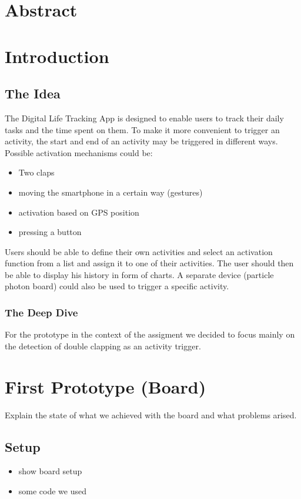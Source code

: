 \documentclass
[
 12pt, %
       DIV12,
       a4paper,
       oneside,
       titlepage,
       parskip=half,
       headings=normal,
       listof=totoc,
       bibliography=totoc,
       index=totoc,
       captions=tableheading,
       ]{scrreprt}
\author{Dennis Müller}
\date{\today}
\title{}
\begin{document}
\tableofcontents


\chapter{Abstract}
\label{sec:orgf5e4737}
\chapter{Introduction}
\label{sec:orgef98480}
\section{The Idea}
\label{sec:org9600a05}

The Digital Life Tracking App is designed to enable users to track their daily tasks and the time spent on them.
To make it more convenient to trigger an activity, the start and end of an activity may be triggered in different ways. 
Possible activation mechanisms could be:
\begin{itemize}
\item Two claps
\item moving the smartphone in a certain way (gestures)
\item activation based on GPS position
\item pressing a button
\end{itemize}

Users should be able to define their own activities and select an activation function from a list and assign it to one of their activities.
The user should then be able to display his history in form of charts.
A separate device (particle photon board) could also be used to trigger a specific activity.

\subsection{The Deep Dive}
\label{sec:org7e5fafa}
For the prototype in the context of the assigment we decided to focus mainly on the detection of double clapping as an activity trigger.



\chapter{First Prototype (Board)}
\label{sec:orgc97a297}
Explain the state of what we achieved with the board and what problems arised.
\section{Setup}
\label{sec:org03748f5}
\begin{itemize}
\item show board setup
\item some code we used
\end{itemize}
\end{document}
